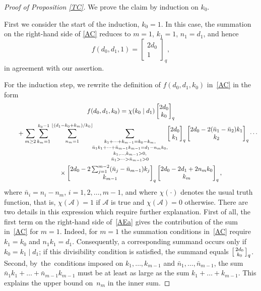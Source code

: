 \documentclass[10pt,a4paper]{amsart}
\def\fl#1{\lfloor#1\rfloor}
\begin{document}
\begin{proof}[Proof of Proposition \ref{TC}]
We prove the claim by induction on $k_0$.

First we consider the start of the induction, $k_0=1$.
In this case, the summation on  the right-hand side of \eqref{AC} reduces to
$m=1$,  $k_1=1$, $n_1=d_1$, and hence
\begin{equation*}
f(d_0,d_1,1)=\begin{bmatrix} 2d_0\\1\end{bmatrix}_q,
\end{equation*}
in agreement with our assertion.

For the induction step, we rewrite the definition of $f(d_0,d_1,k_0)$
in~\eqref{AC} in the form
\begin{gather}
f(d_0,d_1,k_0)=
\chi(k_0\mid d_1)\begin{bmatrix} 2d_0\\k_0\end{bmatrix}_q
\nonumber\\ \qquad{}
+\sum_{m\ge2}\sum_{k_m=1}^{k_0-1}\sum_{n_m=1}^{\fl{(d_1-k_0+k_m)/k_0}}
\kern-3pt
\underset{\bar n_1>\dots>\bar n_{m-1}>0}
{
\underset{k_1,\dots,k_{m-1}>0,}
{
\underset{\bar n_1k_1+\dots+\bar n_{m-1}k_{m-1}=d_1-n_mk_0,}
{\sum_{k_1+\dots+k_{m-1}=k_0-k_m,}}}}
\kern-3pt
\begin{bmatrix} 2d_0\\k_1\end{bmatrix}_q
\begin{bmatrix} 2d_0-2(\bar n_1-\bar n_2)k_1\\k_2\end{bmatrix}_q
\cdots\nonumber\\ \qquad\quad{}
\times
\begin{bmatrix} 2d_0-2\sum_{j=1}^{m-2}(\bar n_j-\bar n_{m-1})k_j\\k_{m-1}\end{bmatrix}_q
\begin{bmatrix} 2d_0-2d_1+2n_mk_0\\k_m\end{bmatrix}_q,
\label{AEa}
\end{gather}
where $\bar n_i=n_i-n_m$, $i=1,2,\dots,m-1$, and where $\chi(\cdot)$
denotes the usual truth function, that is, $\chi(\mathcal A)=1$ if
$\mathcal A$ is true and $\chi(\mathcal A)=0$ otherwise.
There are two details in this expression which require further
explanation. First of all, the first term on the right-hand side
of~\eqref{AEa} gives the contribution of the sum in~\eqref{AC} for $m=1$.
Indeed, for $m=1$ the summation conditions in~\eqref{AC} require
$k_1=k_0$ and $n_1k_1=d_1$. Consequently, a corresponding summand
occurs only if $k_0=k_1\mid d_1$; if this divisibility condition
is satisfied, the summand equals $\bigl[\smallmatrix
2d_0\\k_0\endsmallmatrix\bigr]_q$. Second, by~the~conditions imposed
on $k_1,\dots,k_{m-1}$ and $\bar n_1,\dots,\bar n_{m-1}$, the sum
$\bar n_1k_1+\dots+\bar n_{m-1}k_{m-1}$ must be at least as large
as the sum $k_1+\dots+k_{m-1}$. This explains the upper bound on~$n_m$
in the inner sum.


\end{proof}
\end{document}
